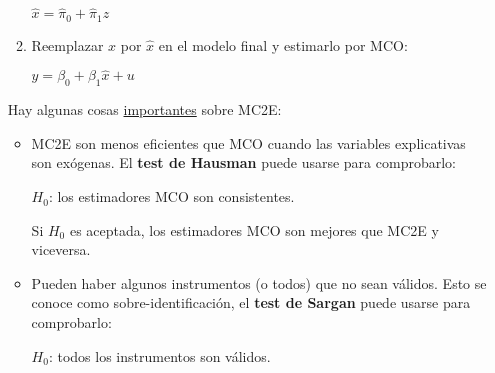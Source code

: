 \documentclass[10pt, a4paper, landscape]{extarticle}
\begin{document}
\begin{multicols}{3}
\begin{itemize}[leftmargin=*]
\begin{enumerate}[leftmargin=*]
\begin{center}
						$\hat{x} = \hat{\pi}_0 + \hat{\pi}_1 z$
					\end{center}
					\item Reemplazar $x$ por $\hat{x}$ en el modelo final y estimarlo por MCO:
					\begin{center}
						$y = \beta_0 + \beta_1 \hat{x} + u$
					\end{center}
				\end{enumerate}
				Hay algunas cosas \underline{importantes} sobre MC2E:
				\begin{itemize}[leftmargin=*]
					\item MC2E son menos eficientes que MCO cuando las variables explicativas son exógenas. El \textbf{test de Hausman} puede usarse para comprobarlo:
					\begin{center}
						$H_0$: los estimadores MCO son consistentes.
					\end{center}
					Si $H_0$ es aceptada, los estimadores MCO son mejores que MC2E y viceversa.
					\item Pueden haber algunos instrumentos (o todos) que no sean válidos. Esto se conoce como sobre-identificación, el \textbf{test de Sargan} puede usarse para comprobarlo:
					\begin{center}
						$H_0$: todos los instrumentos son válidos.
					\end{center}
				\end{itemize}
			\end{itemize}
\columnbreak

\end{multicols}
\end{document}

